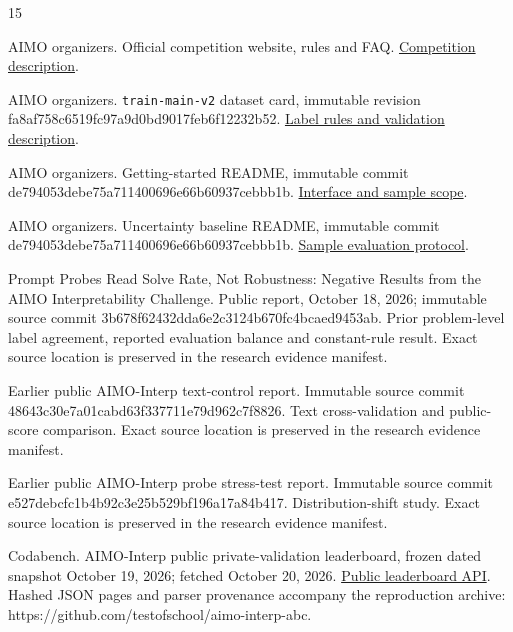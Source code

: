 \begin{thebibliography}{15}

\small\raggedright

 AIMO organizers. Official competition website, rules and FAQ. \href{https://aimo-interp.github.io/}{Competition description}.

 AIMO organizers. \texttt{train-main-v2} dataset card, immutable revision fa8af758c6519fc97a9d0bd9017feb6f12232b52. \href{https://huggingface.co/datasets/aimo-interp/train-main-v2/blob/fa8af758c6519fc97a9d0bd9017feb6f12232b52/README.md}{Label rules and validation description}.

 AIMO organizers. Getting-started README, immutable commit de794053debe75a711400696e66b60937cebbb1b. \href{https://github.com/aimo-interp/getting-started/blob/de794053debe75a711400696e66b60937cebbb1b/README.md}{Interface and sample scope}.

 AIMO organizers. Uncertainty baseline README, immutable commit de794053debe75a711400696e66b60937cebbb1b. \href{https://github.com/aimo-interp/getting-started/blob/de794053debe75a711400696e66b60937cebbb1b/solutions/uncertainty-profiling/README.md}{Sample evaluation protocol}.

 Prompt Probes Read Solve Rate, Not Robustness: Negative Results from the AIMO Interpretability Challenge. Public report, October 18, 2026; immutable source commit 3b678f62432dda6e2c3124b670fc4bcaed9453ab. Prior problem-level label agreement, reported evaluation balance and constant-rule result. Exact source location is preserved in the research evidence manifest.

 Earlier public AIMO-Interp text-control report. Immutable source commit 48643c30e7a01cabd63f337711e79d962c7f8826. Text cross-validation and public-score comparison. Exact source location is preserved in the research evidence manifest.

 Earlier public AIMO-Interp probe stress-test report. Immutable source commit e527debcfc1b4b92c3e25b529bf196a17a84b417. Distribution-shift study. Exact source location is preserved in the research evidence manifest.

 Codabench. AIMO-Interp public private-validation leaderboard, frozen dated snapshot October 19, 2026; fetched October 20, 2026. \href{https://www.codabench.org/api/phases/30038/get_leaderboard/}{Public leaderboard API}. Hashed JSON pages and parser provenance accompany the reproduction archive: https://github.com/testofschool/aimo-interp-abc.


\end{thebibliography}
